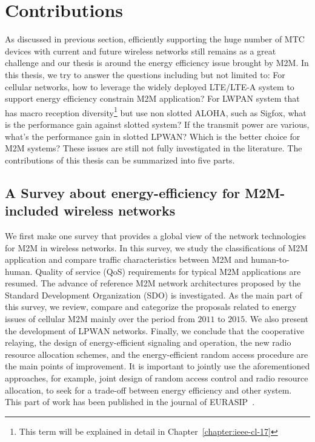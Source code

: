 \section{Contributions}
\label{sec:introduction-contributions}
As discussed in previous section, efficiently supporting the huge number of MTC devices with current and future wireless networks still remains as a great challenge and our thesis is around the energy efficiency issue brought by M2M. In this thesis, we try to answer the questions including but not limited to: For cellular networks, how to leverage the widely deployed LTE/LTE-A system to support energy efficiency constrain M2M application? For LWPAN system that has macro reception diversity\footnote{This term will be explained in detail in Chapter~\ref{chapter:ieee-cl-17} } but use non slotted ALOHA, such as Sigfox, what is the performance gain against slotted system? If the transmit power are various, what's the performance gain in slotted LPWAN? 
Which is the better choice for M2M systems? These issues are still not fully investigated in the literature. The contributions of this thesis can be summarized into five parts.
\subsection{A Survey about energy-efficiency for M2M-included wireless networks}
We first make one survey that provides a global view of the network technologies for M2M in wireless networks. In this survey, we study the classifications of M2M application and compare traffic characteristics between M2M and human-to-human. Quality of service (QoS) requirements for typical M2M applications are resumed. The advance of reference M2M network architectures proposed by the Standard Development Organization (SDO) is investigated. As the main part of this survey,
we review, compare and categorize the proposals related to energy issues of cellular M2M mainly over the period from $2011$ to $2015$. We also present the development of LPWAN networks. Finally, we conclude that the cooperative relaying, the design of energy-efficient signaling and operation, the new radio resource allocation schemes, and the energy-efficient random access procedure are the main points of improvement. It is important to jointly use the aforementioned approaches, for example, joint design of random access control and radio resource allocation, to seek for a trade-off between energy efficiency and other system. This part of work has been published in the journal of EURASIP~\cite{song2016survey}.

